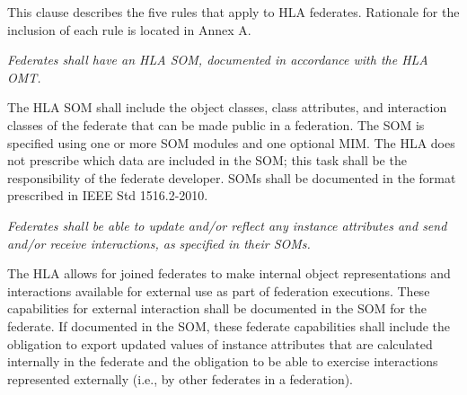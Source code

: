 
\newpage
\enlargethispage{18pt}

This clause describes the five rules that apply to HLA federates. Rationale for the inclusion of each rule is\linebreak
located in Annex A.


\textit{Federates shall have an HLA SOM, documented in accordance with the HLA OMT.}
\vspace{3.3pt}

The HLA SOM shall include the object classes, class attributes, and interaction classes of the federate that\linebreak
can be made public in a federation. The SOM is specified using one or more SOM modules and one optional\linebreak
MIM. The HLA does not prescribe which data are included in the SOM; this task shall be the responsibility\linebreak
of the federate developer. SOMs shall be documented in the format prescribed in IEEE Std 1516.2-2010.


\textit{Federates shall be able to update and/or reflect any instance attributes and send and/or receive interactions,\linebreak
as specified in their SOMs.}
\vspace{3.3pt}

The HLA allows for joined federates to make internal object representations and interactions available for\linebreak
external use as part of federation executions. These capabilities for external interaction shall be documented\linebreak
in the SOM for the federate. If documented in the SOM, these federate capabilities shall include the\linebreak
obligation to export updated values of instance attributes that are calculated internally in the federate and the\linebreak
obligation to be able to exercise interactions represented externally (i.e., by other federates in a federation).

